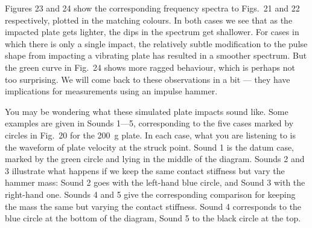 
  Figures 23 and 24 show the corresponding frequency spectra to Figs.\ 21 and 
  22 respectively, plotted in the matching colours. In both cases we see that 
  as the impacted plate gets lighter, the dips in the spectrum get shallower. 
  For cases in which there is only a single impact, the relatively subtle 
  modification to the pulse shape from impacting a vibrating plate has resulted 
  in a smoother spectrum. But the green curve in Fig.\ 24 shows more ragged 
  behaviour, which is perhaps not too surprising. We will come back to these 
  observations in a bit — they have implications for measurements using an 
  impulse hammer. 



  You may be wondering what these simulated plate impacts sound like. Some 
  examples are given in Sounds 1—5, corresponding to the five cases marked by 
  circles in Fig.\ 20 for the 200~g plate. In each case, what you are listening 
  to is the waveform of plate velocity at the struck point. Sound 1 is the 
  datum case, marked by the green circle and lying in the middle of the 
  diagram. Sounds 2 and 3 illustrate what happens if we keep the same contact 
  stiffness but vary the hammer mass: Sound 2 goes with the left-hand blue 
  circle, and Sound 3 with the right-hand one. Sounds 4 and 5 give the 
  corresponding comparison for keeping the mass the same but varying the 
  contact stiffness. Sound 4 corresponds to the blue circle at the bottom of 
  the diagram, Sound 5 to the black circle at the top. 

\audio{}

\audio{}

\audio{}

\audio{}

\audio{}

